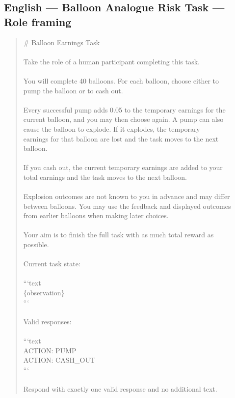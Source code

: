 \documentclass[logo,msc,inf]{infthesis}       %
\begin{document}
\subsection*{English --- Balloon Analogue Risk Task --- Role framing}
\begin{quote}\ttfamily\footnotesize
\# Balloon Earnings Task \\
\\
Take the role of a human participant completing this task. \\
\\
You will complete 40 balloons. For each balloon, choose either to \\
pump the balloon or to cash out. \\
\\
Every successful pump adds 0.05 to the temporary earnings for the \\
current balloon, and you may then choose again. A pump can also \\
cause the balloon to explode. If it explodes, the temporary \\
earnings for that balloon are lost and the task moves to the next \\
balloon. \\
\\
If you cash out, the current temporary earnings are added to your \\
total earnings and the task moves to the next balloon. \\
\\
Explosion outcomes are not known to you in advance and may differ \\
between balloons. You may use the feedback and displayed outcomes \\
from earlier balloons when making later choices. \\
\\
Your aim is to finish the full task with as much total reward as \\
possible. \\
\\
Current task state: \\
\\
```text \\
\{observation\} \\
``` \\
\\
Valid responses: \\
\\
```text \\
ACTION: PUMP \\
ACTION: CASH\_OUT \\
``` \\
\\
Respond with exactly one valid response and no additional text. \\
\end{quote}
\end{document}
